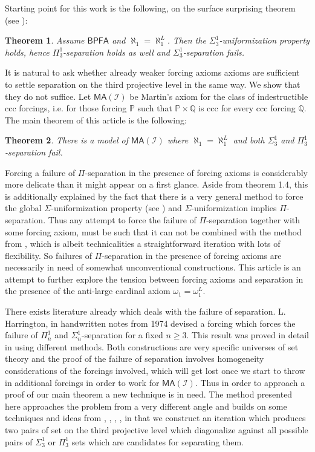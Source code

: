 \documentclass[a4paper,11pt]{article}
\newtheorem{theorem}{Theorem}[section]
\newcommand{\forceP}{\mathbb{P}}
\newcommand{\forceQ}{\mathbb{Q}}
\newcommand{\BPFA}{\mathsf{BPFA}}
\begin{document}
Starting point for this work is the following, on the surface surprising theorem (see \cite{Ho1}):
\begin{theorem}
Assume $\BPFA$ and $\aleph_1=\aleph_1^{L}$. Then the  ${\Sigma}^1_3$-uniformization property holds, hence $\Pi^1_3$-separation holds as well and $\Sigma^1_3$-separation fails.
\end{theorem}
It is natural to ask whether already weaker forcing axioms axioms are sufficient to settle separation on the third projective level in the same way. We show that they do not suffice. Let 
$\mathsf{MA} (\mathcal{I} )$ be Martin's axiom for the class of indestructible ccc forcings, i.e. for those forcing $\forceP$ such that $\forceP \times \forceQ$ is ccc for every ccc forcing $\forceQ$. The main theorem of this article is the following:
\begin{theorem}
There is a model of $\mathsf{MA} (\mathcal{I} )$ where  $\aleph_1=\aleph_1^L$ and both $\Sigma^1_3$ and $\Pi^1_3$-separation fail.
\end{theorem}


Forcing a failure of $\Pi$-separation in the presence of forcing axioms is considerably more delicate than it might appear on a first glance. Aside from theorem 1.4, this is additionally explained by the fact that there is a very general method to force the global $\Sigma$-uniformization property (see \cite{Ho6}) and $\Sigma$-uniformization implies $\Pi$-separation. Thus any attempt to force the failure of $\Pi$-separation together with some forcing axiom, must be such that it can not be combined with the method from \cite{Ho6}, which is albeit technicalities a straightforward iteration with lots of flexibility. So failures of $\Pi$-separation in the presence of forcing axioms are necessarily in need of somewhat unconventional constructions. This article is an attempt to further explore the tension between forcing axioms and separation in the presence of the anti-large cardinal axiom $\omega_1=\omega_1^L$.

There exists literature already which deals with the failure of separation. L. Harrington, in handwritten notes from 1974 devised a forcing which forces the 
 failure of ${\Pi^1_n}$ and ${\Sigma^1_n}$-separation for a fixed $n \ge 3$. This result was proved in detail in \cite{KL} using different methods. Both constructions are very specific universes of set theory and the proof of the failure of separation involves  homogeneity considerations of the forcings involved, which will get lost once we start to throw in additional forcings in order to work for $\mathsf{MA} (\mathcal{I} )$. Thus in order to approach a proof of our main theorem a new technique is in need. The method presented here approaches the problem from a very different angle and builds on some techniques and ideas from \cite{Ho1}, \cite{Ho2}, \cite{Ho3}, \cite{Ho7}, in that we construct an iteration which produces two pairs of set on the third projective level which diagonalize against all possible pairs of $\Sigma^1_3$ or $\Pi^1_3$ sets which are candidates for  separating them. 
\end{document}
